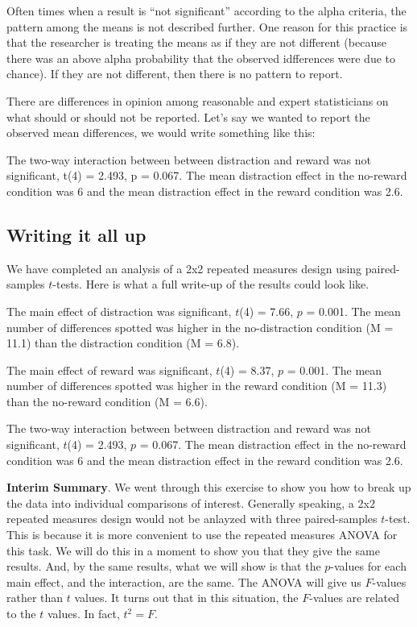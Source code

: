 \documentclass[]{book}
\begin{document}
Often times when a result is ``not significant'' according to the alpha criteria, the pattern among the means is not described further. One reason for this practice is that the researcher is treating the means as if they are not different (because there was an above alpha probability that the observed idfferences were due to chance). If they are not different, then there is no pattern to report.

There are differences in opinion among reasonable and expert statisticians on what should or should not be reported. Let's say we wanted to report the observed mean differences, we would write something like this:

The two-way interaction between between distraction and reward was not significant, t(4) = 2.493, p = 0.067. The mean distraction effect in the no-reward condition was 6 and the mean distraction effect in the reward condition was 2.6.

\hypertarget{writing-it-all-up}{%
\subsection{Writing it all up}\label{writing-it-all-up}}

We have completed an analysis of a 2x2 repeated measures design using paired-samples \(t\)-tests. Here is what a full write-up of the results could look like.

The main effect of distraction was significant, \(t\)(4) = 7.66, \(p\) = 0.001. The mean number of differences spotted was higher in the no-distraction condition (M = 11.1) than the distraction condition (M = 6.8).

The main effect of reward was significant, \(t\)(4) = 8.37, \(p\) = 0.001. The mean number of differences spotted was higher in the reward condition (M = 11.3) than the no-reward condition (M = 6.6).

The two-way interaction between between distraction and reward was not significant, \(t\)(4) = 2.493, \(p\) = 0.067. The mean distraction effect in the no-reward condition was 6 and the mean distraction effect in the reward condition was 2.6.

\textbf{Interim Summary}. We went through this exercise to show you how to break up the data into individual comparisons of interest. Generally speaking, a 2x2 repeated measures design would not be anlayzed with three paired-samples \(t\)-test. This is because it is more convenient to use the repeated measures ANOVA for this task. We will do this in a moment to show you that they give the same results. And, by the same results, what we will show is that the \(p\)-values for each main effect, and the interaction, are the same. The ANOVA will give us \(F\)-values rather than \(t\) values. It turns out that in this situation, the \(F\)-values are related to the \(t\) values. In fact, \(t^2 = F\).
\end{document}
